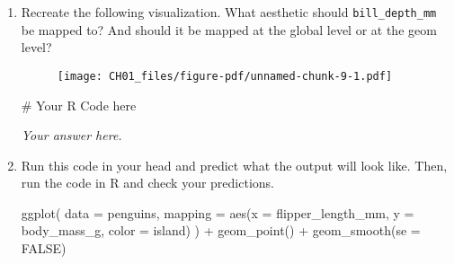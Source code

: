 \documentclass[
  letterpaper,
  DIV=11,
  numbers=noendperiod]{scrreprt}
\newenvironment{Shaded}{\begin{snugshade}}{\end{snugshade}}
\newcommand{\AttributeTok}[1]{\textcolor[rgb]{0.40,0.45,0.13}{#1}}
\newcommand{\CommentTok}[1]{\textcolor[rgb]{0.37,0.37,0.37}{#1}}
\newcommand{\ConstantTok}[1]{\textcolor[rgb]{0.56,0.35,0.01}{#1}}
\newcommand{\FunctionTok}[1]{\textcolor[rgb]{0.28,0.35,0.67}{#1}}
\newcommand{\NormalTok}[1]{\textcolor[rgb]{0.00,0.23,0.31}{#1}}
\newcommand{\SpecialCharTok}[1]{\textcolor[rgb]{0.37,0.37,0.37}{#1}}
\begin{document}
\begin{enumerate}
\begin{tcolorbox}
  \end{tcolorbox}
\item
  Recreate the following visualization. What aesthetic should
  \texttt{bill\_depth\_mm} be mapped to? And should it be mapped at the
  global level or at the geom level?

  \begin{figure}

  {\centering \texttt{[image: CH01\_files/figure-pdf/unnamed-chunk-9-1.pdf]}

  }

  \end{figure}

  \begin{tcolorbox}[enhanced jigsaw, left=2mm, rightrule=.15mm, bottomtitle=1mm, opacitybacktitle=0.6, leftrule=.75mm, opacityback=0, colframe=quarto-callout-note-color-frame, bottomrule=.15mm, coltitle=black, toptitle=1mm, colback=white, titlerule=0mm, colbacktitle=quarto-callout-note-color!10!white, title={Answer}, toprule=.15mm, breakable, arc=.35mm]

\begin{Shaded}
\begin{Highlighting}[]
\CommentTok{\# Your R Code here}
\end{Highlighting}
\end{Shaded}

  \emph{Your answer here.}

  \end{tcolorbox}
\item
  Run this code in your head and predict what the output will look like.
  Then, run the code in R and check your predictions.

\begin{Shaded}
\begin{Highlighting}[]
\FunctionTok{ggplot}\NormalTok{(}
  \AttributeTok{data =}\NormalTok{ penguins,}
  \AttributeTok{mapping =} \FunctionTok{aes}\NormalTok{(}\AttributeTok{x =}\NormalTok{ flipper\_length\_mm, }\AttributeTok{y =}\NormalTok{ body\_mass\_g, }\AttributeTok{color =}\NormalTok{ island)}
\NormalTok{) }\SpecialCharTok{+}
    \FunctionTok{geom\_point}\NormalTok{() }\SpecialCharTok{+}
    \FunctionTok{geom\_smooth}\NormalTok{(}\AttributeTok{se =} \ConstantTok{FALSE}\NormalTok{)}
\end{Highlighting}
\end{Shaded}

  \begin{tcolorbox}[enhanced jigsaw, left=2mm, rightrule=.15mm, bottomtitle=1mm, opacitybacktitle=0.6, leftrule=.75mm, opacityback=0, colframe=quarto-callout-note-color-frame, bottomrule=.15mm, coltitle=black, toptitle=1mm, colback=white, titlerule=0mm, colbacktitle=quarto-callout-note-color!10!white, title={Answer}, toprule=.15mm, breakable, arc=.35mm]


\end{tcolorbox}
\end{enumerate}
\end{document}

